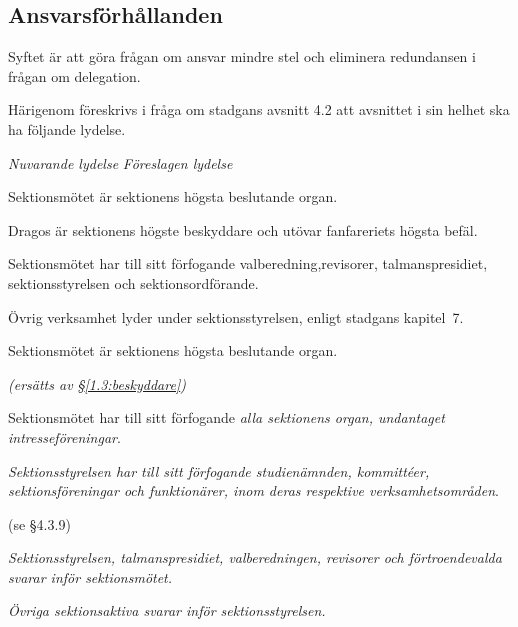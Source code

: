 \documentclass{article}
\newenvironment{lydelse}
    {\begin{paracol}{2}%
        \emph{Nuvarande lydelse}%
        \switchcolumn%
        \emph{Föreslagen lydelse}%
    \end{paracol}%
    \begin{enumerate}[label=\thesubsection.\arabic*]%
    \begin{paracol}{2}%
    }{\end{paracol}\end{enumerate}}
\begin{document}
\subsection{Ansvarsförhållanden} \label{4.2:ansvar}
Syftet är att göra frågan om ansvar mindre stel och eliminera redundansen i frågan om delegation.

Härigenom föreskrivs i fråga om stadgans avsnitt 4.2 att avsnittet i sin helhet ska ha följande lydelse.

\begin{lydelse}
	\item Sektionsmötet är sektionens högsta beslutande organ.
    \item Dragos är sektionens högste beskyddare och utövar fanfareriets högsta befäl.
    \item Sektionsmötet har till sitt förfogande valberedning,revisorer, talmanspresidiet, sektionsstyrelsen och sektionsordförande.
    \item Övrig verksamhet lyder under sektionsstyrelsen, enligt stadgans kapitel~7.
    
  \switchcolumn
  \setcounter{enumi}{0}  
    \item Sektionsmötet är sektionens högsta beslutande organ.
      \label{4.1:högststart}
    
    \item[] %
    \emph{(ersätts av \S\ref{1.3:beskyddare})}

    \item Sektionsmötet har till sitt förfogande \emph{alla sektionens organ, undantaget intresseföreningar}.
    
    \item \emph{Sektionsstyrelsen har till sitt förfogande studienämnden, kommittéer, sektionsföreningar och funktionärer, inom deras respektive verksamhetsområden}.
      \label{4.1:högstend}
	
  \switchcolumn*
    (se \S 4.3.9)
    
  \switchcolumn
   \item \emph{Sektionsstyrelsen, talmanspresidiet, valberedningen, revisorer och förtroendevalda svarar inför sektionsmötet.} \label{4.2:ansvar1}
   \item \emph{Övriga sektionsaktiva svarar inför sektionsstyrelsen.}
      \label{4.2:ansvar2}


\end{lydelse}
\end{document}
